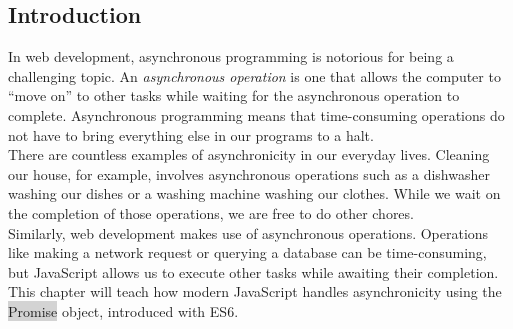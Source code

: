 \documentclass[11pt]{article}
\begin{document}
\subsection{Introduction}
In web development, asynchronous programming is notorious for being a challenging topic. An \textit{asynchronous operation} is one that allows the computer to “move on” to other tasks while waiting for the asynchronous operation to complete. Asynchronous programming means that time-consuming operations do not have to bring everything else in our programs to a halt. \\
\newline
There are countless examples of asynchronicity in our everyday lives. Cleaning our house, for example, involves asynchronous operations such as a dishwasher washing our dishes or a washing machine washing our clothes. While we wait on the completion of those operations, we are free to do other chores. \\
\newline
Similarly, web development makes use of asynchronous operations. Operations like making a network request or querying a database can be time-consuming, but JavaScript allows us to execute other tasks while awaiting their completion. \\
\newline
This chapter will teach how modern JavaScript handles asynchronicity using the \colorbox{lightgray}{Promise} object, introduced with ES6. 
\end{document}
